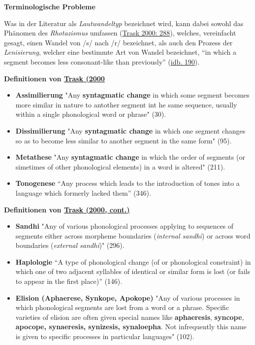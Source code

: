\par\noindent\textbf{Terminologische Probleme}

Was in der Literatur als \emph{Lautwandeltyp} bezeichnet wird, kann
dabei sowohl das Phänomen des \emph{Rhotazismus} umfassen
(\href{Trask2000}{Trask 2000: 288}), welches, vereinfacht gesagt, einen
Wandel von /s/ nach /r/ bezeichnet, als auch den Prozess der
\emph{Lenisierung}, welcher eine bestimmte Art von Wandel bezeichnet,
``in which a segment becomes less consonant-like than previously''
(\href{Trask2000}{idb. 190}).



\par\noindent\textbf{Definitionen von
\href{http://bibliography.lingpy.org?key=Trask2000}{Trask (2000}}

\begin{itemize}
\itemsep1pt\parskip0pt
\item
  \textbf{Assimilierung} "Any \textbf{syntagmatic change} in which some
  segment becomes more similar in nature to antother segment int he same
  sequence, usually within a single phonological word or phrase" (30).
\item
  \textbf{Dissimilierung} "Any \textbf{syntagmatic change} in which one
  segment changes so as to become less similar to another segment in the
  same form" (95).
\item
  \textbf{Metathese} "Any \textbf{syntagmatic change} in which the order
  of segments (or simetimes of other phonological elements) in a word is
  altered" (211).
\item
  \textbf{Tonogenese} ``Any process which leads to the introduction of
  tones into a language which formerly lacked them'' (346).
\end{itemize}



\par\noindent\textbf{Definitionen von
\href{http://bibliography.lingpy.org?key=Trask2000}{Trask (2000,
cont.)}}

\begin{itemize}
\itemsep1pt\parskip0pt
\item
  \textbf{Sandhi} "Any of various phonological processes applying to
  sequences of segments either across morpheme boundaries
  (\emph{internal sandhi}) or across word boundaries (\emph{external
  sandhi})" (296).
\item
  \textbf{Haplologie} ``A type of phonological change (of or
  phonological constraint) in which one of two adjacent syllables of
  identical or similar form is lost (or fails to appear in the first
  place)'' (146).
\item
  \textbf{Elision (Aphaerese, Synkope, Apokope)} "Any of various
  processes in which phonological segments are lost from a word or a
  phrase. Specific varieties of elision are often given special names
  like \textbf{aphaeresis}, \textbf{syncope}, \textbf{apocope,
  synaeresis, synizesis, synaloepha}. Not infrequently this name is
  given to specific processes in particular languages" (102).
\end{itemize}



